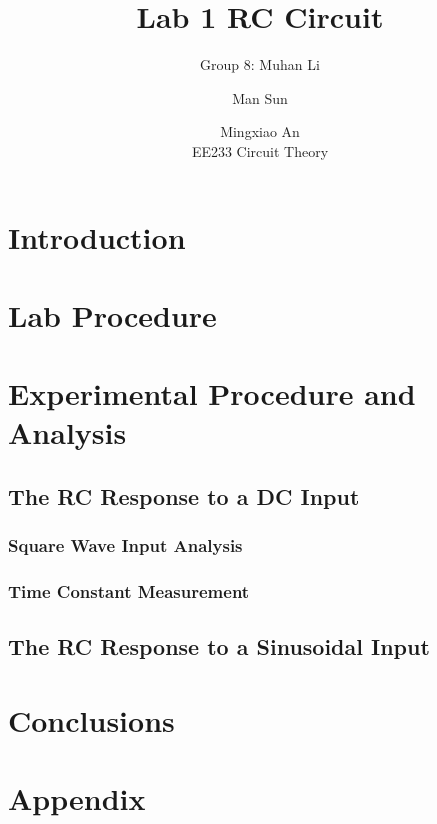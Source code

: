 \documentclass{IEEEtran}
\title{Lab 1 RC Circuit}
\author{Group 8: Muhan Li \and Man Sun \and Mingxiao An \\ EE233 Circuit Theory}
\begin{document}
	
	\maketitle
	
	\begin{abstract}
		
	\end{abstract}
	\section{Introduction}
	
	\section{Lab Procedure}
	
	\section{Experimental Procedure and Analysis}
	\subsection{The RC Response to a DC Input}
	\subsubsection{Square Wave Input Analysis}
	
	\subsubsection{Time Constant Measurement}
	
	\subsection{The RC Response to a Sinusoidal Input}
	
	\section{Conclusions}
	
	\section{Appendix}
	
	
\end{document}
